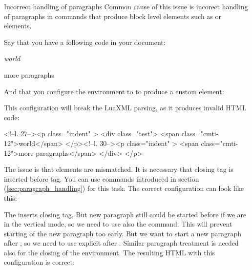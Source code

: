 \begin{issue}{Incorrect handling of paragraphs}
Common cause of this issue is incorect handling of paragraphs in commands that produce block level
elements such as  or  elements.

Say that you have a following code in your document:

\begin{texsource}
\newenvironment{test}{\itshape}{}

\begin{test}
world

more paragraphs
\end{test}
\end{texsource}

And that you configure the  environment to to produce a custom  element:

\begin{texsource}
\end{texsource}

This configuration will break the LuaXML parsing, as it produces invalid HTML code:

\begin{htmlsource}
<!--l. 27--><p class="indent" >   <div class="test"> <span 
class="cmti-12">world</span>
</p><!--l. 30--><p class="indent" >   <span 
class="cmti-12">more paragraphs</span>
</div>
</p>
\end{htmlsource}

The issue is that  elements are mismatched. It is necessary that closing  tag
is inserted before  tag. You can use commands introduced in section  
(\ref{sec:paragraph_handling}) for this task. The correct configuration can look like this:

\begin{texsource}
{\ifvmode\IgnorePar\fi\EndP{}\par}{}{}
\end{texsource}

The \texcommand{\EndP} inserts closing  tag. But new paragraph still could be started before 
 if we are in the vertical mode, so we need to use also the \texcommand{\ifvmode\IgnorePar\fi}
command. This will prevent starting of the new paragraph too early. But we want to start a new paragraph after 
, so we need to use explicit \texcommand{\par} after \texcommand{\HCode}. Similar paragraph 
treatment is needed also for the closing of the environment. The resulting HTML with this configuration is correct:


\end{issue}
